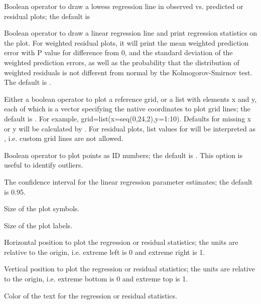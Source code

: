 \documentclass[a4paper]{book}
\begin{document}
\begin{Arguments}
\begin{ldescription}
\item[\code{lowess}] Boolean operator to draw a lowess regression line in observed vs. predicted or
residual plots; the default is 

\item[\code{reg}] Boolean operator to draw a linear regression line and print regression statistics on the plot.
For weighted residual plots, it will print the mean weighted prediction error with P value for difference from 0,
and the standard deviation of the weighted prediction errors, as well as the probability that the distribution of
weighted residuals is not different from normal by the Kolmogorov-Smirnov test.  The default is .

\item[\code{grid}] Either a boolean operator to plot a reference grid, or a list with elements x and y,
each of which is a vector specifying the native coordinates to plot grid lines; the default is .
For example, grid=list(x=seq(0,24,2),y=1:10).  Defaults for missing x or y will be calculated by .
For residual plots, list values for  will be interpreted as , i.e. custom grid lines are not allowed.

\item[\code{ident}] Boolean operator to plot points as ID numbers; the default is .
This option is useful to identify outliers.

\item[\code{ci}] The confidence interval for the linear regression parameter estimates; the default is 0.95.

\item[\code{cex}] Size of the plot symbols.

\item[\code{cex.lab}] Size of the plot labels.

\item[\code{x.stat}] Horizontal position to plot the regression or residual statistics;
the units are relative to the origin, i.e. extreme left is 0 and extreme right is 1.

\item[\code{y.stat}] Vertical position to plot the regression or residual statistics; 
the units are relative to the origin, i.e. extreme bottom is 0 and extreme top is 1.

\item[\code{col.stat}] Color of the text for the regression or residual statistics.


\end{ldescription}
\end{Arguments}
\end{document}
